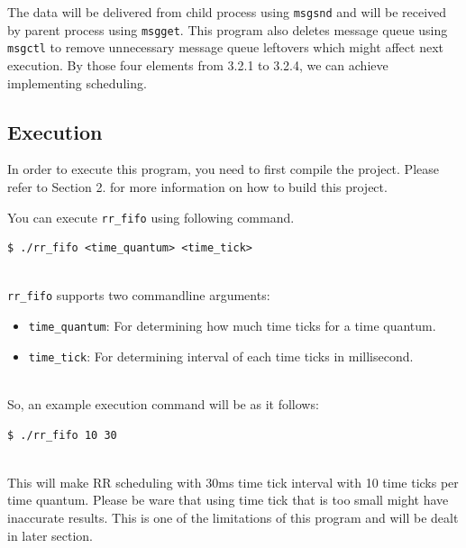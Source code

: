 \documentclass{homework}
\begin{document}
The data will be delivered from child process using \texttt{msgsnd} and will be received by parent process using \texttt{msgget}. This program also deletes message queue using \texttt{msgctl} to remove unnecessary message queue leftovers which might affect next execution. By those four elements from 3.2.1 to 3.2.4, we can achieve implementing scheduling.

\pagebreak
\subsection{Execution}
In order to execute this program, you need to first compile the project. Please refer to Section 2. for more information on how to build this project.


You can execute \texttt{rr_fifo} using following command.
\\
\begin{center}
\begin{code}
\begin{verbatim}
$ ./rr_fifo <time_quantum> <time_tick>
\end{verbatim}
\end{code}
\end{center}
\\
\texttt{rr_fifo} supports two commandline arguments:
\begin{itemize}
   \item \texttt{time_quantum}: For determining how much time ticks for a time quantum.
   \item \texttt{time_tick}: For determining interval of each time ticks in millisecond.
\end{itemize}
\\
So, an example execution command will be as it follows:
\\
\begin{center}
\begin{code}
\begin{verbatim}
$ ./rr_fifo 10 30
\end{verbatim}
\end{code}
\end{center}
\\
This will make RR scheduling with 30ms time tick interval with 10 time ticks per time quantum. Please be ware that using time tick that is too small might have inaccurate results. This is one of the limitations of this program and will be dealt in later section.
\end{document}
